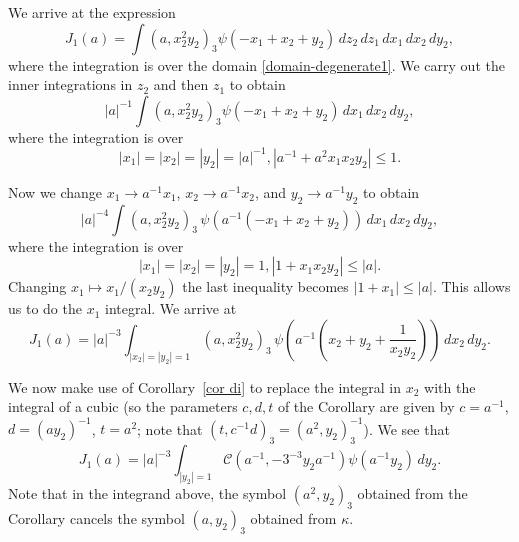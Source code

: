 \documentclass[12pt]{amsart}
\newcommand{\abs}[1]{\left|{#1}\right|}
\newcommand{\Cu}{\mathcal{C}}
\theoremstyle{remark}
\begin{document}
We arrive at the expression
$$J_1(a)=\int (a,x_2^2 y_2)_3 \psi(-x_1+x_2+y_2)\, dz_2\,dz_1\,dx_1\,dx_2\,dy_2,$$
where the integration is over the domain \eqref{domain-degenerate1}.  We carry out the inner integrations in $z_2$ and then $z_1$ to obtain
$$\abs{a}^{-1}\int (a,x_2^2 y_2)_3 \psi(-x_1+x_2+y_2)\,dx_1\,dx_2\,dy_2,$$
where the integration is over 
$$\abs{x_1}=\abs{x_2}=\abs{y_2}=\abs{a}^{-1}, \abs{a^{-1}+a^2 x_1x_2y_2}\leq 1.$$

Now we change $x_1\to a^{-1}x_1$, $x_2\to a^{-1}x_2$, and $y_2\to a^{-1}y_2$ to obtain 
$$\abs{a}^{-4}\int (a,x_2^2 y_2)_3\, \psi(a^{-1}(-x_1+x_2+y_2))\,dx_1\,dx_2\,dy_2,$$
where the integration is over 
$$\abs{x_1}=\abs{x_2}=\abs{y_2}=1, \abs{1+x_1x_2y_2}\leq \abs{a}.$$
Changing $x_1\mapsto x_1/(x_2y_2)$ the last inequality becomes $\abs{1+x_1}\leq\abs{a}$.  This allows us to do the $x_1$ integral. We arrive at
$$J_1(a)=\abs{a}^{-3}\int_{\abs{x_2}=\abs{y_2}=1} (a,x_2^2y_2)_3\, \psi\left(a^{-1}\left(x_2+y_2+\frac{1}{x_2y_2}\right)\right)\,dx_2\,dy_2.$$

We now make use of Corollary~\ref{cor di} to replace the integral in $x_2$  with the integral of a cubic (so the parameters $c,d,t$ of the 
Corollary are given by $c=a^{-1}$, $d=(ay_2)^{-1}$, $t=a^2$; note that $(t,c^{-1}d)_3=(a^2,y_2)_3^{-1}$).  We see that
$$J_1(a)=\abs{a}^{-3}\int_{\abs{y_2}=1} \Cu(a^{-1},-3^{-3}y_2a^{-1})\psi(a^{-1}y_2)\,dy_2.$$
Note that in the integrand above, the symbol $(a^2,y_2)_3$ obtained from the Corollary cancels the symbol $(a,y_2)_3$ obtained from $\kappa$.
\end{document}
